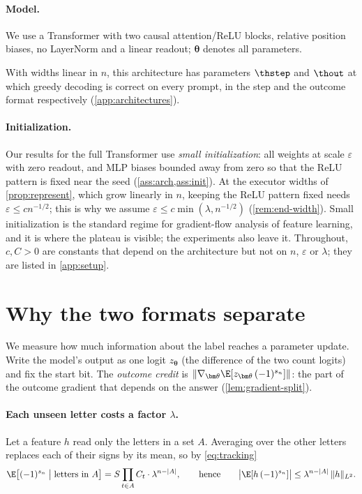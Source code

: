 \paragraph{Model.} We use a Transformer with two causal attention/ReLU blocks, relative position
biases, no LayerNorm and a linear readout; $\bm\theta$ denotes all parameters.

\begin{proposition}
\label{prop:represent}
With widths linear in $n$, this architecture has parameters $\thstep$ and $\thout$ at which greedy decoding
is correct on every prompt, in the step and the outcome format respectively (\cref{app:architectures}).
\end{proposition}

\paragraph{Initialization.} Our results for the full Transformer use \emph{small initialization}: all weights at scale
$\varepsilon$ with zero readout, and MLP biases bounded away from zero so that the ReLU pattern is fixed
near the seed (\cref{ass:arch,ass:init}). At the executor widths of \cref{prop:represent}, which grow linearly in $n$, keeping
the ReLU pattern fixed needs $\varepsilon\le cn^{-1/2}$; this is why we assume $\varepsilon\le c\min(\lambda,n^{-1/2})$
(\cref{rem:end-width}). Small initialization is the standard regime for gradient-flow analysis of feature learning, and it
is where the plateau is visible; the experiments also leave it.
Throughout, $c,C>0$ are constants that depend on the architecture but not on $n$, $\varepsilon$ or $\lambda$;
they are listed in \cref{app:setup}.

\section{Why the two formats separate}
\label{sec:credit}
\label{sec:outcome}

We measure how much information about the label reaches a parameter update. Write the model's
output as one logit $z_{\bm\theta}$ (the difference of the two count logits) and fix the start bit.
The \emph{outcome credit} is $\|\nabla_{\bm\theta}\E[z_{\bm\theta}\,(-1)^{s_n}]\|$: the part of the outcome
gradient that depends on the answer (\cref{lem:gradient-split}).

\paragraph{Each unseen letter costs a factor $\lambda$.} Let a feature $h$ read only the letters in a set $A$. Averaging
over the other letters replaces each of their signs by its mean, so by \cref{eq:tracking}
\begin{equation}
 \E\bigl[(-1)^{s_n}\bigm| \text{letters in }A\bigr]=S\prod_{t\in A}C_t\cdot\lambda^{n-|A|},
 \qquad\text{hence}\qquad
 \bigl|\E[h\,(-1)^{s_n}]\bigr|\le\lambda^{n-|A|}\,\|h\|_{L^2}.
 \label{eq:credit-degree}
\end{equation}

